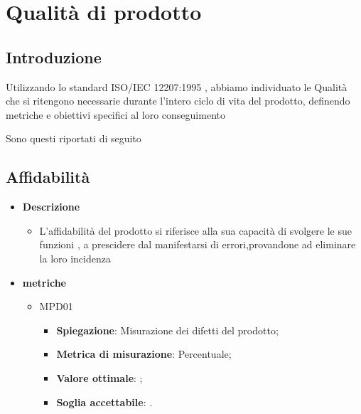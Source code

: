 \chapter{Qualità di prodotto}\label{qualita-di-prodotto}

\section{Introduzione}
Utilizzando lo standard ISO/IEC 12207:1995 , abbiamo individuato le Qualità che si ritengono necessarie durante l'intero ciclo di vita del prodotto, definendo metriche e obiettivi specifici al loro conseguimento

Sono questi riportati di seguito 

\section{Affidabilità}
\begin{itemize}
    \item \textbf{Descrizione}
    \begin{itemize}
        \item L'affidabilità del prodotto si riferisce alla sua capacità di svolgere le sue funzioni , a prescidere dal manifestarsi di errori,provandone ad eliminare la loro incidenza
    \end{itemize}
    
    \item \textbf{metriche}
    \begin{itemize}
        \item MPD01
        \begin{itemize}
            \item \textbf{Spiegazione}: Misurazione dei difetti del prodotto;
        \item \textbf{Metrica di misurazione}: Percentuale;
        \item \textbf{Valore ottimale}: ;
        \item \textbf{Soglia accettabile}: .
        \end{itemize}
    \end{itemize}
    \end{itemize}

